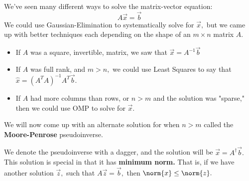 


We've seen many different ways to solve the matrix-vector equation:
\begin{equation}
  A \vec{x} = \vec{b}
\end{equation}
We could use Gaussian-Elimination to systematically solve for $\vec{x},$ but we came up with better techniques each depending on the shape of an $m \times n$ matrix $A.$
\begin{itemize}
  \item If $A$ was a square, invertible, matrix, we saw that $\vec{x} = A^{-1} \vec{b}$
  \item If $A$ was full rank, and $m > n,$ we could use Least Squares to say that $\hat{x} = (A^{T} A)^{-1} A^{T} \vec{b}.$
  \item If $A$ had more columns than rows, or $n > m$ and the solution was "sparse," then we could use OMP to solve for $\vec{x}.$
\end{itemize}
We will now come up with an alternate solution for when $n > m$ called the \textbf{Moore-Penrose} pseudoinverse.

We denote the pseudoinverse with a dagger, and the solution will be $\vec{x} = A^{\dagger} \vec{b}.$
This solution is special in that it has \textbf{minimum norm.} That is, if we have another solution $\vec{z},$ such that $A \vec{z} = \vec{b},$ then $\norm{x} \leq \norm{z}.$

